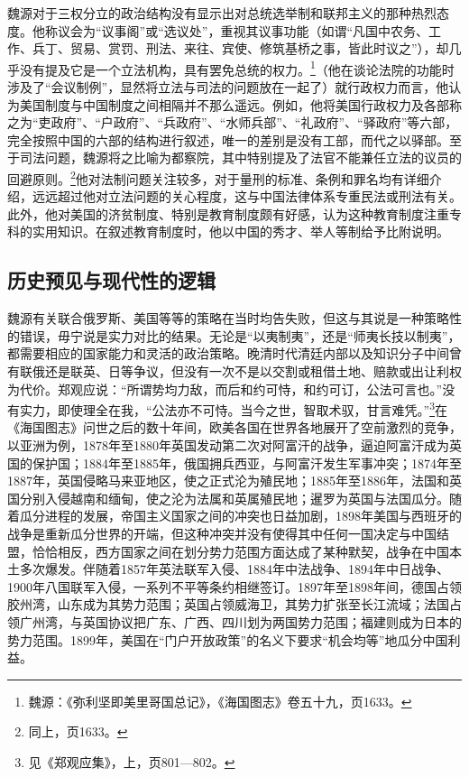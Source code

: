 \documentclass[a4paper, 12pt, openright]{ctexbook}
\begin{document}
魏源对于三权分立的政治结构没有显示出对总统选举制和联邦主义的那种热烈态度。他称议会为“议事阁”或“选议处”，重视其议事功能（如谓“凡国中农务、工作、兵丁、贸易、赏罚、刑法、来往、宾使、修筑基桥之事，皆此时议之”），却几乎没有提及它是一个立法机构，具有罢免总统的权力。\footnote{魏源：《弥利坚即美里哥国总记》，《海国图志》卷五十九，页1633。}（他在谈论法院的功能时涉及了“会议制例”，显然将立法与司法的问题放在一起了）就行政权力而言，他认为美国制度与中国制度之间相隔并不那么遥远。例如，他将美国行政权力及各部称之为“吏政府”、“户政府”、“兵政府”、“水师兵部”、“礼政府”、“驿政府”等六部，完全按照中国的六部的结构进行叙述，唯一的差别是没有工部，而代之以驿部。至于司法问题，魏源将之比喻为都察院，其中特别提及了法官不能兼任立法的议员的回避原则。\footnote{同上，页1633。}他对法制问题关注较多，对于量刑的标准、条例和罪名均有详细介绍，远远超过他对立法问题的关心程度，这与中国法律体系专重民法或刑法有关。此外，他对美国的济贫制度、特别是教育制度颇有好感，认为这种教育制度注重专科的实用知识。在叙述教育制度时，他以中国的秀才、举人等制给予比附说明。

\subsection{历史预见与现代性的逻辑}

魏源有关联合俄罗斯、美国等等的策略在当时均告失败，但这与其说是一种策略性的错误，毋宁说是实力对比的结果。无论是“以夷制夷”，还是“师夷长技以制夷”，都需要相应的国家能力和灵活的政治策略。晚清时代清廷内部以及知识分子中间曾有联俄还是联英、日等争议，但没有一次不是以交割或租借土地、赔款或出让利权为代价。郑观应说：“所谓势均力敌，而后和约可恃，和约可订，公法可言也。”没有实力，即使理全在我，“公法亦不可恃。当今之世，智取术驭，甘言难凭。”\footnote{见《郑观应集》，上，页801—802。}在《海国图志》问世之后的数十年间，欧美各国在世界各地展开了空前激烈的竞争，以亚洲为例，1878年至1880年英国发动第二次对阿富汗的战争，逼迫阿富汗成为英国的保护国；1884年至1885年，俄国拥兵西亚，与阿富汗发生军事冲突；1874年至1887年，英国侵略马来亚地区，使之正式沦为殖民地；1885年至1886年，法国和英国分别入侵越南和缅甸，使之沦为法属和英属殖民地；暹罗为英国与法国瓜分。随着瓜分进程的发展，帝国主义国家之间的冲突也日益加剧，1898年美国与西班牙的战争是重新瓜分世界的开端，但这种冲突并没有使得其中任何一国决定与中国结盟，恰恰相反，西方国家之间在划分势力范围方面达成了某种默契，战争在中国本土多次爆发。伴随着1857年英法联军入侵、1884年中法战争、1894年中日战争、1900年八国联军入侵，一系列不平等条约相继签订。1897年至1898年间，德国占领胶州湾，山东成为其势力范围；英国占领威海卫，其势力扩张至长江流域；法国占领广州湾，与英国协议把广东、广西、四川划为两国势力范围；福建则成为日本的势力范围。1899年，美国在“门户开放政策”的名义下要求“机会均等”地瓜分中国利益。
\end{document}
